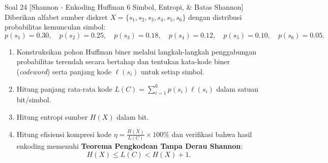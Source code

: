 \documentclass[11pt,a4paper]{article}
\begin{document}

\begin{soalshannon}{Soal 24 [Shannon - Enkoding Huffman 6 Simbol, Entropi, \& Batas Shannon]}
Diberikan alfabet sumber diskret $X = \{s_1, s_2, s_3, s_4, s_5, s_6\}$ dengan distribusi probabilitas kemunculan simbol:
\[
p(s_1) = 0.30, \quad p(s_2) = 0.25, \quad p(s_3) = 0.18, \quad p(s_4) = 0.12, \quad p(s_5) = 0.10, \quad p(s_6) = 0.05.
\]
\begin{enumerate}[label=(\alph*)]
    \item Konstruksikan pohon Huffman biner melalui langkah-langkah penggabungan probabilitas terendah secara bertahap dan tentukan kata-kode biner (\textit{codeword}) serta panjang kode $\ell(s_i)$ untuk setiap simbol.
    \item Hitung panjang rata-rata kode $L(C) = \sum_{i=1}^6 p(s_i) \ell(s_i)$ dalam satuan bit/simbol.
    \item Hitung entropi sumber $H(X)$ dalam bit.
    \item Hitung efisiensi kompresi kode $\eta = \frac{H(X)}{L(C)} \times 100\%$ dan verifikasi bahwa hasil enkoding memenuhi \textbf{Teorema Pengkodean Tanpa Derau Shannon}:
    \[
    H(X) \le L(C) < H(X) + 1.
    \]
\end{enumerate}
\end{soalshannon}
\end{document}
